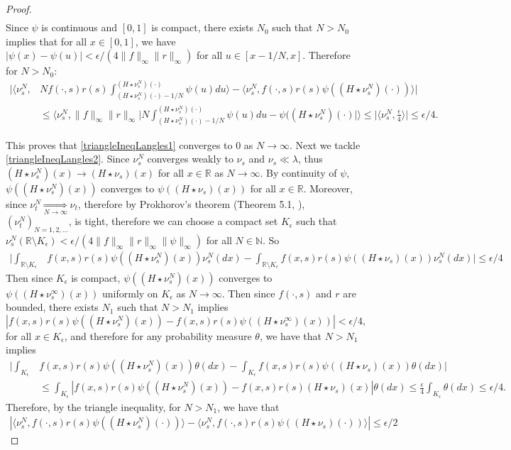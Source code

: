 \documentclass{article}
\newcommand{\B}[1]{\mathbb{#1}}
\begin{document}
\begin{proof}
\begin{align}
    \end{align}
    Since $\psi$ is continuous and $[0,1]$ is compact, there exists $N_0$ such that $N>N_0$ implies that for all $x\in [0,1]$, we have $|\psi(x)-\psi(u)|<\epsilon/(4\|f\|_\infty \|r\|_\infty)$ for all $u\in [x-1/N,x]$. Therefore for $N>N_0$:
    \begin{align*}\Big|\Big\langle \nu^N_s,&Nf(\cdot,s)r(s)\int_{(H\star \nu_s^N)(\cdot)-1/N}^{(H\star \nu_s^N)(\cdot)}\psi(u)du\Big\rangle - \langle \nu_s^N, f(\cdot,s)r(s)\psi((H\star \nu_s^N)(\cdot))\rangle\Big|
    \\ &\leq \Bigg\langle \nu_s^N, \|f\|_\infty\|r\|_\infty\Bigg|N\int_{(H\star\nu_s^N)(\cdot)-1/N}^{(H\star \nu_s^N)(\cdot)}\psi(u)du-\psi((H\star\nu_s^N)(\cdot)\Bigg|\Bigg\rangle \leq \Big|\Big\langle \nu_s^N, \frac{\epsilon}{4}\Big\rangle\Big| \leq \epsilon/4.\end{align*}

    This proves that \eqref{triangleIneqLangles1} converges to $0$ as $N\to\infty$. Next we tackle \eqref{triangleIneqLangles2}. Since $\nu_s^N$ converges weakly to $\nu_s$ and $\nu_s \ll \lambda$, thus $(H\star \nu_s^N)(x)\to(H\star \nu_s)(x)$ for all $x\in \B{R}$ as $N\to\infty$. By continuity of $\psi$, $\psi((H\star \nu_s^N)(x))$ converges to $\psi((H\star \nu_s)(x))$ for all $x\in \B{R}$. Moreover, since $\nu_t^N\underset{N\to\infty}{\Longrightarrow}\nu_t$, therefore by Prokhorov's theorem (Theorem 5.1, \cite{billingsley}), $(\nu_t^N)_{N=1,2,\ldots}$, is tight, therefore we can choose a compact set $K_\epsilon$ such that $\nu_s^N(\B{R}\setminus K_\epsilon)<\epsilon/(4\|f\|_\infty \|r\|_\infty \|\psi\|_\infty)$ for all $N\in \B{N}$. So
    \begin{align*}
        \Bigg| \int_{\B{R}\setminus K_\epsilon} &f(x,s)r(s)\psi((H\star \nu_s^N)(x))\nu_s^N(dx)-\int_{\B{R}\setminus K_\epsilon} f(x,s)r(s)\psi((H\star \nu_s)(x))\nu_s^N(dx)\Bigg|\leq \epsilon/4
    \end{align*}
    Then since $K_\epsilon$ is compact, $\psi((H\star \nu_s^N)(x))$ converges to $\psi((H\star \nu_s^\infty)(x))$ uniformly on $K_\epsilon$ as $N\to\infty$. Then since $f(\cdot,s)$ and $r$ are bounded, there exists $N_1$ such that $N>N_1$ implies
    $$|f(x,s)r(s)\psi((H\star \nu_s^N)(x))-f(x,s)r(s)\psi((H\star \nu_s^\infty)(x))|<\epsilon/4,$$
    for all $x\in K_\epsilon$, and therefore for any probability measure $\theta$, we have that $N>N_1$ implies
    \begin{align*}
        \Bigg| \int_{K_\epsilon} &f(x,s)r(s)\psi((H\star \nu_s^N)(x))\theta(dx)-\int_{K_\epsilon} f(x,s)r(s)\psi((H\star \nu_s)(x))\theta(dx)\Bigg|\\
        &\leq \int_{K_\epsilon} |f(x,s)r(s)\psi((H\star \nu_s^N)(x))-f(x,s)r(s)(H\star \nu_s)(x) |\theta(dx)\leq \frac{\epsilon}{4}\int_{K_\epsilon}\theta(dx)\leq \epsilon/4.
    \end{align*}
    Therefore, by the triangle inequality, for $N>N_1$, we have that
    \begin{align*}
        |\langle \nu_s^N, f(\cdot,s)r(s)\psi((H\star \nu_s^N)(\cdot))\rangle - \langle \nu_s^N, f(\cdot,s)r(s)\psi((H\star \nu_s)(\cdot))\rangle| \leq \epsilon/2
    \end{align*}
    

\end{proof}
\end{document}
